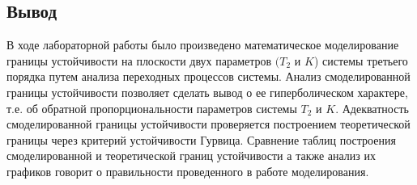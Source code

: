\documentclass[a4paper, 11pt]{article}
\begin{document}
\newpage
\begin{center}
\section*{Вывод}
\end{center}
\par 
В ходе лабораторной работы было произведено математическое моделирование границы устойчивости на плоскости двух параметров $(T_2$ и $K$) системы третьего порядка путем анализа переходных процессов системы. Анализ смоделированной  границы устойчивости позволяет сделать вывод о ее гиперболическом характере, т.е. об обратной пропорциональности параметров системы  $T_2$ и $K$. Адекватность смоделированной границы устойчивости проверяется построением теоретической границы через критерий устойчивости Гурвица. Сравнение таблиц построения смоделированной и теоретической границ устойчивости а также анализ их графиков говорит о правильности проведенного в работе моделирования.   
\end{document}
